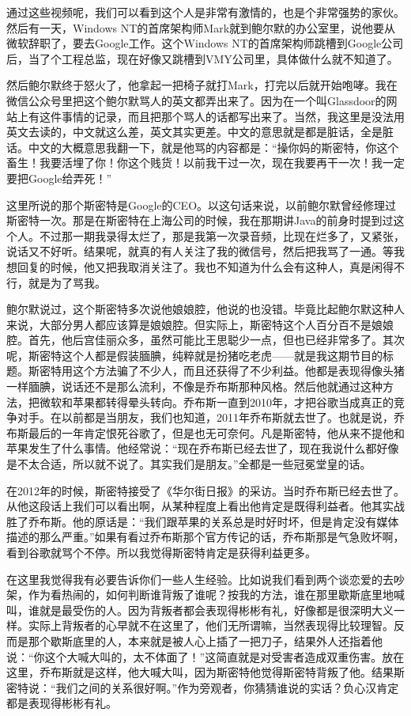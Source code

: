 \documentclass[
  letterpaper,
  DIV=11,
  numbers=noendperiod]{scrreprt}
\begin{document}
通过这些视频呢，我们可以看到这个人是非常有激情的，也是个非常强势的家伙。然后有一天，Windows
NT的首席架构师Mark就到鲍尔默的办公室里，说他要从微软辞职了，要去Google工作。这个Windows
NT的首席架构师跳槽到Google公司后，当了个工程总监，现在好像又跳槽到VMY公司里，具体做什么就不知道了。

然后鲍尔默终于怒火了，他拿起一把椅子就打Mark，打完以后就开始咆哮。我在微信公众号里把这个鲍尔默骂人的英文都弄出来了。因为在一个叫Glassdoor的网站上有这件事情的记录，而且把那个骂人的话都写出来了。当然，我这里是没法用英文去读的，中文就这么差，英文其实更差。中文的意思就是都是脏话，全是脏话。中文的大概意思我翻一下，就是他骂的内容都是：``操你妈的斯密特，你这个畜生！我要活埋了你！你这个贱货！以前我干过一次，现在我要再干一次！我一定要把Google给弄死！''

这里所说的那个斯密特是Google的CEO。以这句话来说，以前鲍尔默曾经修理过斯密特一次。那是在斯密特在上海公司的时候，我在那期讲Java的前身时提到过这个人。不过那一期我录得太烂了，那是我第一次录音频，比现在烂多了，又紧张，说话又不好听。结果呢，就真的有人关注了我的微信号，然后把我骂了一通。等我想回复的时候，他又把我取消关注了。我也不知道为什么会有这种人，真是闲得不行，就是为了骂我。

鲍尔默说过，这个斯密特多次说他娘娘腔，他说的也没错。毕竟比起鲍尔默这种人来说，大部分男人都应该算是娘娘腔。但实际上，斯密特这个人百分百不是娘娘腔。首先，他后宫佳丽众多，虽然可能比王思聪少一点，但也已经非常多了。其次呢，斯密特这个人都是假装腼腆，纯粹就是扮猪吃老虎------就是我这期节目的标题。斯密特用这个方法骗了不少人，而且还获得了不少利益。他都是表现得像头猪一样腼腆，说话还不是那么流利，不像是乔布斯那种风格。然后他就通过这种方法，把微软和苹果都转得晕头转向。乔布斯一直到2010年，才把谷歌当成真正的竞争对手。在以前都是当朋友，我们也知道，2011年乔布斯就去世了。也就是说，乔布斯最后的一年肯定恨死谷歌了，但是也无可奈何。凡是斯密特，他从来不提他和苹果发生了什么事情。他经常说：``现在乔布斯已经去世了，现在我说什么都好像是不太合适，所以就不说了。其实我们是朋友。''全都是一些冠冕堂皇的话。

在2012年的时候，斯密特接受了《华尔街日报》的采访。当时乔布斯已经去世了。从他这段话上我们可以看出啊，从某种程度上看出他肯定是既得利益者。他其实战胜了乔布斯。他的原话是：``我们跟苹果的关系总是时好时坏，但是肯定没有媒体描述的那么严重。''如果有看过乔布斯那个官方传记的话，乔布斯那是气急败坏啊，看到谷歌就骂个不停。所以我觉得斯密特肯定是获得利益更多。

在这里我觉得我有必要告诉你们一些人生经验。比如说我们看到两个谈恋爱的去吵架，作为看热闹的，如何判断谁背叛了谁呢？按我的方法，谁在那里歇斯底里地喊叫，谁就是最受伤的人。因为背叛者都会表现得彬彬有礼，好像都是很深明大义一样。实际上背叛者的心早就不在这里了，他们无所谓嘛，当然表现得比较理智。反而是那个歇斯底里的人，本来就是被人心上插了一把刀子，结果外人还指着他说：``你这个大喊大叫的，太不体面了！''这简直就是对受害者造成双重伤害。放在这里，乔布斯就是这样，他大喊大叫，因为斯密特他觉得斯密特背叛了他。结果斯密特说：``我们之间的关系很好啊。''作为旁观者，你猜猜谁说的实话？负心汉肯定都是表现得彬彬有礼。
\end{document}
